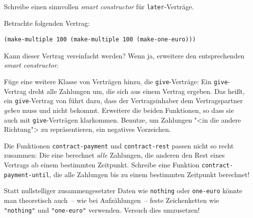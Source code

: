 \begin{aufgabe}
  Schreibe einen sinnvollen \textit{smart constructor} für
  \lstinline{later}-Verträge.
\end{aufgabe}

\begin{aufgabe}
  Betrachte folgenden Vertrag:
\begin{lstlisting}
(make-multiple 100 (make-multiple 100 (make-one-euro)))    
\end{lstlisting}
%
Kann dieser Vertrag vereinfacht werden?  Wenn ja, erweitere den
entsprechenden \textit{smart constructor}.
\end{aufgabe}

\begin{aufgabe}\label{aufgabe:give}
  Füge eine weitere Klasse von Verträgen hinzu, die
  \lstinline{give}-Verträge: Ein \lstinline{give}-Vertrag dreht alle
  Zahlungen um, die sich aus einem Vertrag ergeben.  Das heißt, ein
  \lstinline{give}-Vertrag von  führt dazu, dass der
  Vertragsinhaber dem Vertragspartner  \emph{geben} muss und
  nicht bekommt.  Erweitere die beiden Funktionen, so dass sie auch
  mit \lstinline{give}-Verträgen klarkommen.  Benutze, um Zahlungen
  "<in die andere Richtung"> zu repräsentieren, ein negatives
  Vorzeichen.
\end{aufgabe}

\begin{aufgabe}
  Die Funktionen \lstinline{contract-payment} und
  \lstinline{contract-rest} passen nicht so recht zusammen: Die eine
  berechnet \emph{alle} Zahlungen, die anderen den Rest eines Vertrags
  ab einem bestimmten Zeitpunkt.  Schreibe eine Funktion
  \lstinline{contract-payment-until}, die alle Zahlungen bis zu einem
  bestimmten Zeitpunkt berechnet!
\end{aufgabe}

\begin{aufgabe}\label{aufgabe:aufzaehlung-vs-nullstellig}
  Statt nullstelliger zusammengesetzter Daten wie \lstinline{nothing}
  oder \lstinline{one-euro} könnte man theoretisch auch~-- wie bei
  Aufzählungen~-- feste Zeichenketten wie \lstinline{"nothing"} und
  \lstinline{"one-euro"} verwenden.  Versuch dies umzusetzen!
\end{aufgabe}



